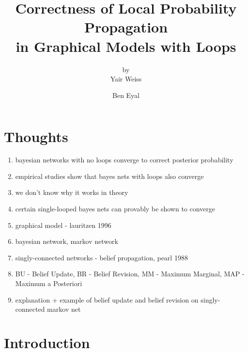 \documentclass{beamer}
\title[]{Correctness of Local Probability Propagation\\in Graphical Models with Loops}
\subtitle{by\\Yair Weiss}
\author{Ben Eyal}
\begin{document}
\frame{\titlepage}
\frame{\tableofcontents}

\section{Thoughts}
\begin{frame}
    \begin{enumerate}
        \item bayesian networks with no loops converge to correct posterior probability
        \item empirical studies show that bayes nets with loops also converge
        \item we don't know why it works in theory
        \item certain single-looped bayes nets can provably be shown to converge
        \item graphical model - lauritzen 1996
        \item bayesian network, markov network
        \item singly-connected networks - belief propagation, pearl 1988
        \item BU - Belief Update, BR - Belief Revision, MM - Maximum Marginal, MAP - Maximum a Posteriori
        \item explanation + example of belief update and belief revision on singly-connected markov net
    \end{enumerate}
\end{frame}
\section{Introduction}
\end{document}
